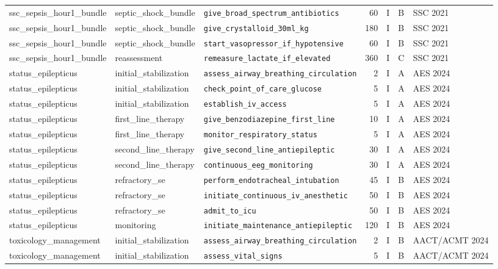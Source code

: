 \begin{longtable}{lllrrll}
ssc\_sepsis\_hour1\_bundle & septic\_shock\_bundle & \texttt{give\_broad\_spectrum\_antibiotics} & 60 & I & B & SSC 2021 \\
ssc\_sepsis\_hour1\_bundle & septic\_shock\_bundle & \texttt{give\_crystalloid\_30ml\_kg} & 180 & I & B & SSC 2021 \\
ssc\_sepsis\_hour1\_bundle & septic\_shock\_bundle & \texttt{start\_vasopressor\_if\_hypotensive} & 60 & I & B & SSC 2021 \\
ssc\_sepsis\_hour1\_bundle & reassessment & \texttt{remeasure\_lactate\_if\_elevated} & 360 & I & C & SSC 2021 \\
status\_epilepticus & initial\_stabilization & \texttt{assess\_airway\_breathing\_circulation} & 2 & I & A & AES 2024 \\
status\_epilepticus & initial\_stabilization & \texttt{check\_point\_of\_care\_glucose} & 5 & I & A & AES 2024 \\
status\_epilepticus & initial\_stabilization & \texttt{establish\_iv\_access} & 5 & I & A & AES 2024 \\
status\_epilepticus & first\_line\_therapy & \texttt{give\_benzodiazepine\_first\_line} & 10 & I & A & AES 2024 \\
status\_epilepticus & first\_line\_therapy & \texttt{monitor\_respiratory\_status} & 5 & I & A & AES 2024 \\
status\_epilepticus & second\_line\_therapy & \texttt{give\_second\_line\_antiepileptic} & 30 & I & A & AES 2024 \\
status\_epilepticus & second\_line\_therapy & \texttt{continuous\_eeg\_monitoring} & 30 & I & A & AES 2024 \\
status\_epilepticus & refractory\_se & \texttt{perform\_endotracheal\_intubation} & 45 & I & B & AES 2024 \\
status\_epilepticus & refractory\_se & \texttt{initiate\_continuous\_iv\_anesthetic} & 50 & I & B & AES 2024 \\
status\_epilepticus & refractory\_se & \texttt{admit\_to\_icu} & 50 & I & B & AES 2024 \\
status\_epilepticus & monitoring & \texttt{initiate\_maintenance\_antiepileptic} & 120 & I & B & AES 2024 \\
toxicology\_management & initial\_stabilization & \texttt{assess\_airway\_breathing\_circulation} & 2 & I & B & AACT/ACMT 2024 \\
toxicology\_management & initial\_stabilization & \texttt{assess\_vital\_signs} & 5 & I & B & AACT/ACMT 2024 \\

\end{longtable}
